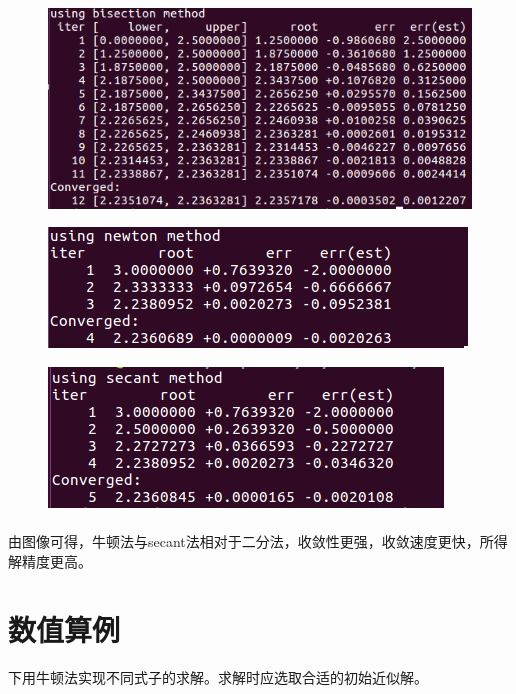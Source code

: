 \documentclass{article}
\begin{document}
		\begin{figure}[ht]
			\includegraphics[width=1\linewidth]{images/bisection.png}
		\end{figure}
			\begin{figure}[ht]
				\includegraphics[width=1\linewidth]{images/newton.png}
			\end{figure}
				\begin{figure}[ht]
					\includegraphics[width=1\linewidth]{images/secant.png}
				\end{figure}
				\paragraph{}由图像可得，牛顿法与secant法相对于二分法，收敛性更强，收敛速度更快，所得解精度更高。
	\section{数值算例}
	下用牛顿法实现不同式子的求解。求解时应选取合适的初始近似解。
	
\end{document}

